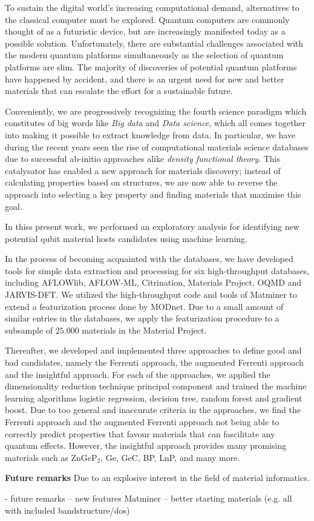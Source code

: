 
To sustain the digital world's increasing computational demand, alternatives to the classical computer must be explored. Quantum computers are commonly thought of as a futuristic device, but are increasingly manifested today as a possible solution. Unfortunately, there are substantial challenges associated with the modern quantum platforms simultaneously as the selection of quantum platforms are slim. The majority of discoveries of potential quantum platforms have happened by accident, and there is an urgent need for new and better materials that can escalate the effort for a sustainable future.

Conveniently, we are progressively recognizing the fourth science paradigm which constitutes of big words like \textit{Big data} and \textit{Data science}, which all comes together into making it possible to extract knowledge from data. In particular, we have during the recent years seen the rise of computational materials science databases due to successful ab-initio approaches alike \textit{density functional theory}. This catalysator has enabled a new approach for materials discovery; instead of calculating properties based on structures, we are now able to reverse the approach into selecting a key property and finding materials that maximise this goal.

In thiss present work, we performed an exploratory analysis for identifying new potential qubit material hosts candidates using machine learning.

In the process of becoming acquainted with the databases, we have developed tools for simple data extraction and processing for six high-throughput databases, including AFLOWlib, AFLOW-ML, Citrination, Materials Project, OQMD and JARVIS-DFT. We utilized the high-throughput code and tools of Matminer to extend a featurization process done by MODnet. Due to a small amount of similar entries in the databases, we apply the featurization procedure to a subsample of $25.000$ materials in the Material Project.

Thereafter, we developed and implemented three approaches to define good and bad candidates, namely the Ferrenti approach, the augmented Ferrenti approach and the insightful approach. For each of the approaches, we applied the dimensionality reduction technique principal component and trained the machine learning algorithms logistic regression, decision tree, random forest and gradient boost. Due to too general and inaccurate criteria in the approaches, we find the Ferrenti approach and the augmented Ferrenti approach not being able to correctly predict properties that favour materials that can fascilitate any quantum effects. However, the insightful approach provides many promising materials such as ZnGeP$_2$, Ge, GeC, BP, LnP, and many more.




\textbf{Future remarks}
Due to an explosive interest in the field of material informatics.

- future remarks
-- new features Matminer
-- better starting materials (e.g. all with included bandstructure/dos)
